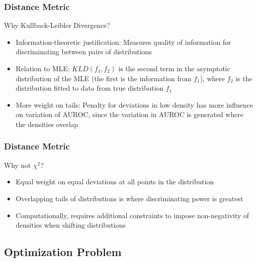 \documentclass{beamer}
\begin{document}

\begin{frame}
\frametitle{Distance Metric}

Why Kullback-Leibler Divergence?
\begin{itemize}
    \item Information-theoretic justification: Measures quality of information for discriminating between pairs of distributions
    \item Relation to MLE: $KLD(f_1, f_2)$ is the second term in the asymptotic distribution of the MLE (the first is the information from $f_1$), where $f_2$ is the distribution fitted to data from true distribution $f_1$
    \item More weight on tails: Penalty for deviations in low density has more influence on variation of AUROC, since the variation in AUROC is generated where the densities overlap
\end{itemize}

\end{frame}


\begin{frame}
\frametitle{Distance Metric}

Why not $\chi^2$?
\begin{itemize}
    \item Equal weight on equal deviations at all points in the distribution
    \item Overlapping tails of distributions is where discriminating power is greatest
    \item Computationally, requires additional constraints to impose non-negativity of densities when shifting distributions
\end{itemize}

\end{frame}



\subsection{Optimization Problem}


\end{document}
